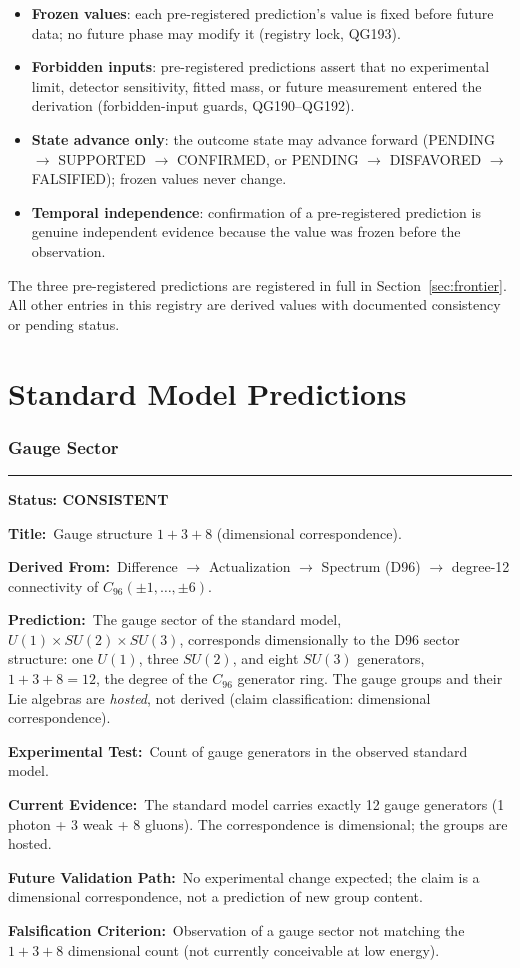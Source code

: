 \documentclass[11pt,a4paper]{article}
\newcommand{\predstart}[2]{%
  \par\medskip\noindent\hrule\par\smallskip
  \noindent{\large\bfseries #1}\hfill{\bfseries Status: #2}\par\smallskip
}
\newcommand{\pfield}[2]{%
  \noindent\textbf{#1:}~#2\par\smallskip
}
\begin{document}
\begin{itemize}
  \item \textbf{Frozen values}: each pre-registered prediction's value is fixed before
        future data; no future phase may modify it (registry lock, QG193).
  \item \textbf{Forbidden inputs}: pre-registered predictions assert that no experimental
        limit, detector sensitivity, fitted mass, or future measurement entered the
        derivation (forbidden-input guards, QG190--QG192).
  \item \textbf{State advance only}: the outcome state may advance forward
        (PENDING $\to$ SUPPORTED $\to$ CONFIRMED, or PENDING $\to$ DISFAVORED $\to$
        FALSIFIED); frozen values never change.
  \item \textbf{Temporal independence}: confirmation of a pre-registered prediction is
        genuine independent evidence because the value was frozen before the observation.
\end{itemize}

The three pre-registered predictions are registered in full in Section~\ref{sec:frontier}.
All other entries in this registry are derived values with documented consistency or pending
status.

\part{Standard Model Predictions}

\section{Gauge Sector}
\label{sec:gauge}

\predstart{AT-P001}{CONSISTENT}
\pfield{Title}{Gauge structure $1+3+8$ (dimensional correspondence).}
\pfield{Derived From}{Difference $\to$ Actualization $\to$ Spectrum (D96) $\to$ degree-12
connectivity of $C_{96}(\pm1,\ldots,\pm6)$.}
\pfield{Prediction}{The gauge sector of the standard model, $U(1)\times SU(2)\times SU(3)$,
corresponds dimensionally to the D96 sector structure: one $U(1)$, three $SU(2)$, and eight
$SU(3)$ generators, $1+3+8 = 12$, the degree of the $C_{96}$ generator ring. The gauge
groups and their Lie algebras are \emph{hosted}, not derived (claim classification:
dimensional correspondence).}
\pfield{Experimental Test}{Count of gauge generators in the observed standard model.}
\pfield{Current Evidence}{The standard model carries exactly 12 gauge generators
(1 photon + 3 weak + 8 gluons). The correspondence is dimensional; the groups are hosted.}
\pfield{Future Validation Path}{No experimental change expected; the claim is a dimensional
correspondence, not a prediction of new group content.}
\pfield{Falsification Criterion}{Observation of a gauge sector not matching the $1+3+8$
dimensional count (not currently conceivable at low energy).}
\end{document}

